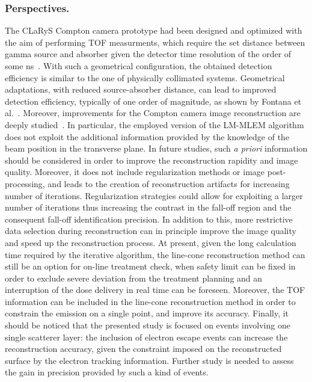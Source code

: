 \subsubsection{Perspectives.}
The CLaRyS Compton camera prototype had been designed and optimized with the aim of performing TOF measurments, which require the set distance between gamma source and absorber given the detector time resolution of the order of some ns~\cite{Roellinghoff2011}. With such a geometrical configuration, the obtained detection efficiency is similar to the one of physically collimated systems. Geometrical adaptations, with reduced source-absorber distance, can lead to improved detection efficiency, typically of one order of magnitude, as shown by Fontana et al.~\cite{Fontana2017}. 
Moreover, improvements for the Compton camera image reconstruction are deeply studied~\cite{Andreyev2016, Schone2017, Taya2017, Huang2018}. In particular, the employed version of the LM-MLEM algorithm does not exploit the additional information provided by the knowledge of the beam position in the transverse plane. In future studies, such \textit{a priori} information should be considered in order to improve the reconstruction rapidity and image quality. Moreover, it does not include regularization methods or image post-processing, and leads to the creation of reconstruction artifacts for increasing number of iterations. Regularization strategies could allow for exploiting a larger number of iterations thus increasing the contrast in the fall-off region and the consequent fall-off identification precision. In addition to this, more restrictive data selection during reconstruction can in principle improve the image quality and speed up the reconstruction process. At present, given the long calculation time required by the iterative algorithm, the line-cone reconstruction method can still be an option for on-line treatment check, when safety limit can be fixed in order to exclude severe deviation from the treatment planning and an interruption of the dose delivery in real time can be foreseen. Moreover, the TOF information can be included in the line-cone reconstruction method in order to constrain the emission on a single point, and improve its accuracy.
Finally, it should be noticed that the presented study is focused on events involving one single scatterer layer: the inclusion of electron escape events can increase the reconstruction accuracy, given the constraint imposed on the reconstructed surface by the electron tracking information. Further study is needed to assess the gain in precision provided by such a kind of events. 

